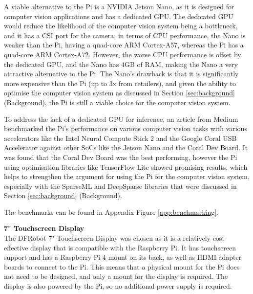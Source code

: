 A viable alternative to the Pi is a NVIDIA Jetson Nano\cite{jetsonnano}, as it is designed for computer vision applications and has a dedicated GPU. The dedicated GPU
would reduce the likelihood of the computer vision system being a bottleneck, and it has a CSI port for the camera; in terms of CPU performance, the Nano is weaker than the Pi,
having a quad-core ARM Cortex-A57, whereas the Pi has a quad-core ARM Cortex-A72\cite{pi4}. However, the worse CPU performance is offset by the dedicated GPU, and the Nano has 4GB of RAM, 
making the Nano a very attractive alternative to the Pi. The Nano's drawback is that it is significantly more expensive than the Pi (up to 3x from retailers), and
given the ability to optimise the computer vision system as discussed in Section \ref{sec:background} (Background), the Pi is still
a viable choice for the computer vision system.

To address the lack of a dedicated GPU for inference, an article from Medium\cite{benchmarks} benchmarked the Pi's performance on various computer vision tasks with 
various accelerators like the Intel Neural Compute Stick 2 and the Google Coral USB Accelerator against other SoCs like the Jetson Nano and the Coral Dev Board. 
It was found that the Coral Dev Board was the best performing, however the Pi using optimisation libraries like TensorFlow Lite showed  promising results, which
helps to strengthen the argument for using the Pi for the computer vision system, especially with the SparseML and DeepSparse libraries that were discussed in Section \ref{sec:background} (Background).

The benchmarks can be found in Appendix Figure \ref{app:benchmarking}.

\vspace{1em}
\noindent
\textbf{7" Touchscreen Display} \\
The DFRobot 7" Touchscreen Display was chosen as it is a relatively cost-effective display that is compatible with the Raspberry Pi.
It has touchscreen support and has a Raspberry Pi 4 mount on its back, as well as HDMI adapter boards to connect to the Pi.
This means that a physical mount for the Pi does not need to be designed, and only a mount for the display is required. The display is also powered by the Pi,
so no additional power supply is required. 

